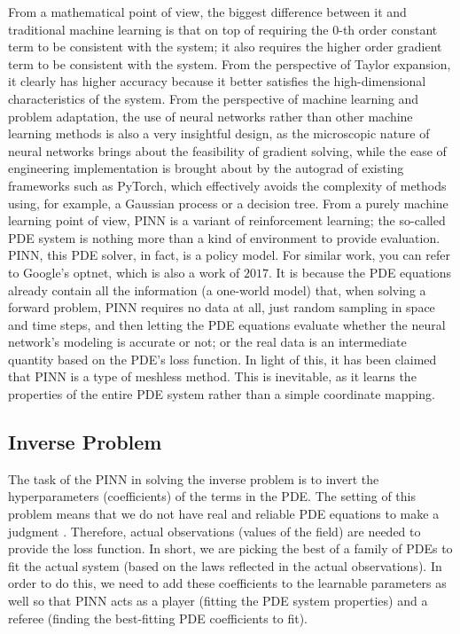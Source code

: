 \documentclass[12pt]{article}
\begin{document}
From a mathematical point of view, the biggest difference between it and traditional machine learning is that on top of requiring the $0$-th order constant term to be consistent with the system; it also requires the higher order gradient term to be consistent with the system. From the perspective of Taylor expansion, it clearly has higher accuracy because it better satisfies the high-dimensional characteristics of the system. From the perspective of machine learning and problem adaptation, the use of neural networks rather than other machine learning methods is also a very insightful design, as the microscopic nature of neural networks brings about the feasibility of gradient solving, while the ease of engineering implementation is brought about by the autograd of existing frameworks such as PyTorch, which effectively avoids the complexity of methods using, for example, a Gaussian process or a decision tree. From a purely machine learning point of view, PINN is a variant of reinforcement learning; the so-called PDE system is nothing more than a kind of environment to provide evaluation. PINN, this PDE solver, in fact, is a policy model. For similar work, you can refer to Google's optnet, which is also a work of $2017$. It is because the PDE equations already contain all the information (a one-world model) that, when solving a forward problem, PINN requires no data at all, just random sampling in space and time steps, and then letting the PDE equations evaluate whether the neural network's modeling is accurate or not; or the real data is an intermediate quantity based on the PDE's loss function. In light of this, it has been claimed that PINN is a type of meshless method. This is inevitable, as it learns the properties of the entire PDE system rather than a simple coordinate mapping.


\subsection{Inverse Problem}
The task of the PINN in solving the inverse problem is to invert the hyperparameters (coefficients) of the terms in the PDE. The setting of this problem means that we do not have real and reliable PDE equations to make a judgment . Therefore, actual observations (values of the field) are needed to provide the loss function. In short, we are picking the best of a family of PDEs to fit the actual system (based on the laws reflected in the actual observations). In order to do this, we need to add these coefficients to the learnable parameters as well so that PINN acts as a player (fitting the PDE system properties) and a referee (finding the best-fitting PDE coefficients to fit).
\end{document}
